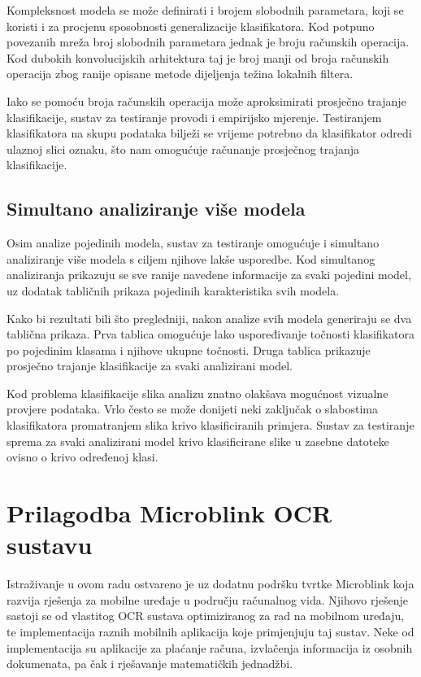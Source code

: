 \documentclass[lmodern, utf8, diplomski, numeric]{fer}
\begin{document}
Kompleksnost modela se može definirati i brojem slobodnih parametara, koji se koristi i za procjenu sposobnosti generalizacije klasifikatora. Kod potpuno povezanih mreža broj slobodnih parametara jednak je broju računskih operacija. Kod dubokih konvolucijskih arhitektura taj je broj manji od broja računskih operacija zbog ranije opisane metode dijeljenja težina lokalnih filtera. 

Iako se pomoću broja računskih operacija može aproksimirati prosječno trajanje klasifikacije, sustav za testiranje provodi i empirijsko mjerenje. Testiranjem klasifikatora na skupu podataka bilježi se vrijeme potrebno da klasifikator odredi ulaznoj slici oznaku, što nam omogućuje računanje prosječnog trajanja klasifikacije.

\subsection{Simultano analiziranje više modela}

Osim analize pojedinih modela, sustav za testiranje omogućuje i simultano analiziranje više modela s ciljem njihove lakše usporedbe. Kod simultanog analiziranja prikazuju se sve ranije navedene informacije za svaki pojedini model, uz dodatak tabličnih prikaza pojedinih karakteristika svih modela. 

Kako bi rezultati bili što pregledniji, nakon analize svih modela generiraju se dva tablična prikaza. Prva tablica omogućuje lako uspoređivanje točnosti klasifikatora po pojedinim klasama i njihove ukupne točnosti. Druga tablica prikazuje prosječno trajanje klasifikacije za svaki analizirani model. 

Kod problema klasifikacije slika analizu znatno olakšava mogućnost vizualne provjere podataka. Vrlo često se može donijeti neki zaključak o slabostima klasifikatora promatranjem slika krivo klasificiranih primjera. Sustav za testiranje sprema za svaki analizirani model krivo klasificirane slike u zasebne datoteke ovisno o krivo određenoj klasi.

\section{Prilagodba Microblink OCR sustavu}

Istraživanje u ovom radu ostvareno je uz dodatnu podršku tvrtke Microblink koja razvija rješenja za mobilne uređaje u području računalnog vida. Njihovo rješenje sastoji se od vlastitog OCR sustava optimiziranog za rad na mobilnom uređaju, te implementacija raznih mobilnih aplikacija koje primjenjuju taj sustav. Neke od implementacija su aplikacije za plaćanje računa, izvlačenja informacija iz osobnih dokumenata, pa čak i rješavanje matematičkih jednadžbi. 
\end{document}
